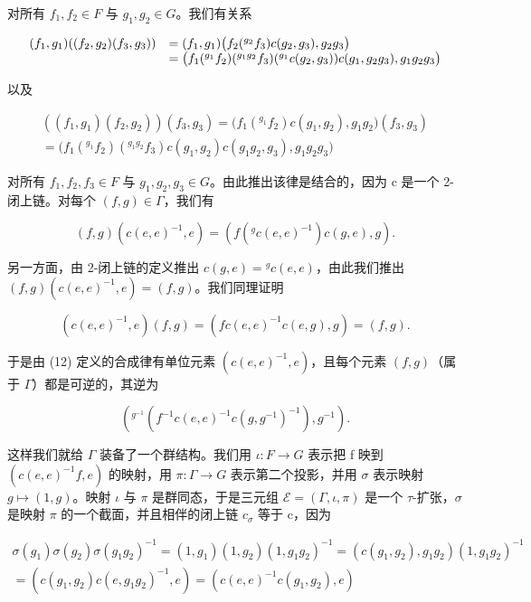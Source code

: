 对所有 \(f_{1}, f_{2} \in F\) 与 \(g_{1}, g_{2} \in G\)。我们有关系

\[
\begin{array}{r l} (f _ {1}, g _ {1}) ((f _ {2}, g _ {2}) (f _ {3}, g _ {3})) & = (f _ {1}, g _ {1}) \big (f _ {2} (^ {g _ {2}} f _ {3}) c (g _ {2}, g _ {3}), g _ {2} g _ {3} \big) \\ & = \big (f _ {1} (^ {g _ {1}} f _ {2}) (^ {g _ {1} g _ {2}} f _ {3}) (^ {g _ {1}} c (g _ {2}, g _ {3})) c (g _ {1}, g _ {2} g _ {3}), g _ {1} g _ {2} g _ {3} \big) \end{array}
\]

以及

\[
\begin{array}{c} ((f _ {1}, g _ {1}) (f _ {2}, g _ {2}))   (f _ {3}, g _ {3}) = \big (f _ {1} (^ {g _ {1}} f _ {2}) c (g _ {1}, g _ {2}), g _ {1} g _ {2} \big) (f _ {3}, g _ {3}) \\ = \big (f _ {1} (^ {g _ {1}} f _ {2}) (^ {g _ {1} g _ {2}} f _ {3}) c (g _ {1}, g _ {2}) c (g _ {1} g _ {2}, g _ {3}), g _ {1} g _ {2} g _ {3} \big) \end{array}
\]

对所有 \(f_{1}, f_{2}, f_{3} \in F\) 与 \(g_{1}, g_{2}, g_{3} \in G\)。由此推出该律是结合的，因为 c 是一个 2-闭上链。对每个 \((f, g) \in \Gamma\)，我们有

\[
(f, g) (c (e, e) ^ {- 1}, e) = (f (^ {g} c (e, e) ^ {- 1}) c (g, e), g).
\]

另一方面，由 2-闭上链的定义推出 \(c(g, e) = {}^g c(e, e)\)，由此我们推出 \((f, g)(c(e, e)^{-1}, e) = (f, g)\)。我们同理证明

\[
(c (e, e) ^ {- 1}, e) (f, g) = (f c (e, e) ^ {- 1} c (e, g), g) = (f, g).
\]

于是由 (12) 定义的合成律有单位元素 \((c(e,e)^{-1},e)\)，且每个元素 \((f,g)\)（属于 \(\Gamma\)）都是可逆的，其逆为

\[
\left(^ {g ^ {- 1}} (f ^ {- 1} c (e, e) ^ {- 1} c (g, g ^ {- 1}) ^ {- 1}), g ^ {- 1}\right).
\]

这样我们就给 \(\Gamma\) 装备了一个群结构。我们用 \(\iota: F \to G\) 表示把 f 映到 \((c(e, e)^{-1}f, e)\) 的映射，用 \(\pi: \Gamma \to G\) 表示第二个投影，并用 \(\sigma\) 表示映射 \(g \mapsto (1, g)\)。映射 \(\iota\) 与 \(\pi\) 是群同态，于是三元组 \(\mathcal{E} = (\Gamma, \iota, \pi)\) 是一个 \(\tau\)-扩张，\(\sigma\) 是映射 \(\pi\) 的一个截面，并且相伴的闭上链 \(c_{\sigma}\) 等于 c，因为

\[
\begin{array}{c} \sigma (g _ {1}) \sigma (g _ {2}) \sigma (g _ {1} g _ {2}) ^ {- 1} = (1, g _ {1}) (1, g _ {2}) (1, g _ {1} g _ {2}) ^ {- 1} = (c (g _ {1}, g _ {2}), g _ {1} g _ {2}) (1, g _ {1} g _ {2}) ^ {- 1} \\ = (c (g _ {1}, g _ {2}) c (e, g _ {1} g _ {2}) ^ {- 1}, e) = (c (e, e) ^ {- 1} c (g _ {1}, g _ {2}), e) \end{array}
\]

